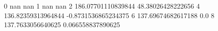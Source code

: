 0 nan nan
1 nan nan
2 186.07701110839844 48.38026428222656
4 136.82359313964844 -0.8731536865234375
6 137.69674682617188 0.0
8 137.7633056640625 0.066558837890625
